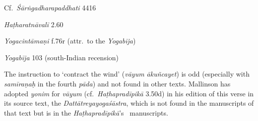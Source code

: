 \begin{ekdosis}
\begin{sources}[hp03_052]
Cf.~\emph{Śārṅgadharapaddhati} 4416
\begin{versinnote}
\end{versinnote}
\end{sources}

\begin{testimonia}[hp03_052]
\emph{Haṭharatnāvalī} 2.60
\begin{versinnote}
\end{versinnote} 

\emph{Yogacintāmaṇi} f.76r (attr.~to the \emph{Yogabīja})
\begin{versinnote}
\end{versinnote}

\emph{Yogabīja} 103 (south-Indian recension)
\begin{versinnote}
\end{versinnote}

\end{testimonia}

\begin{philcomm}[hp03_052]
The instruction to `contract the wind' (\emph{vāyum ākuñcayet}) is odd (especially with \emph{samīraṇaḥ} in the fourth \emph{pāda}) and not found in other texts. Mallin\-son has adopted \emph{yonim} for \emph{vāyum} (cf.~\emph{Haṭhapradīpikā} 3.50d) in his edition of this verse in its source text, the \emph{Dattātreyayogaśāstra}, which is not found in the manuscripts of that text but is in the \emph{Haṭhapradīpikā}’s \textdelta \ manuscripts. \lb


\end{philcomm}
\end{ekdosis}
